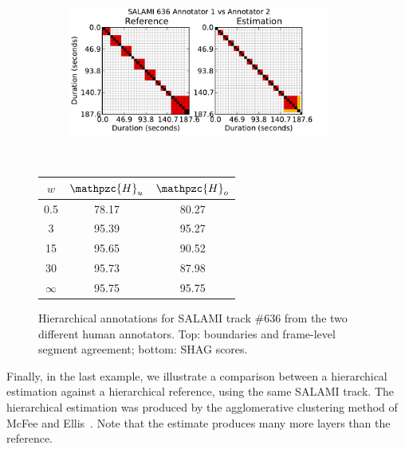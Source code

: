 \documentclass{article}
\def\shag{\ensuremath{\mathpzc{H}}}
\begin{document}
\begin{figure}[t]
  \centering
  \begin{subfigure}{0.5\textwidth}
    \centering
    \includegraphics[width=0.94\textwidth]{plots/SALAMI-SALAMI.pdf}
  \end{subfigure}%
  \\
  \begin{minipage}{0.5\textwidth}
    \centering
    \vspace{10pt}
    \begin{tabular}{|c|c|c|}
      \hline
      $w$       & $\shag_u$       & $\shag_o$      \\
      \hline
      0.5       & 78.17       & 80.27      \\     
      3         & 95.39       & 95.27      \\
      15        & 95.65       & 90.52    \\
      30        & 95.73       & 87.98    \\
      $\infty$  & 95.75       & 95.75    \\
      \hline
    \end{tabular}
  \end{minipage}
  \caption{Hierarchical annotations for SALAMI track \#636 from the two different human annotators. Top: boundaries and frame-level segment agreement; bottom: SHAG scores.}
  \label{fig:SALAMI-SALAMI}
\end{figure}

Finally, in the last example, we illustrate a comparison between a hierarchical estimation against a hierarchical reference, using the same SALAMI track.  The hierarchical estimation
was produced by the agglomerative clustering method of McFee and Ellis~\cite{McFee2014}.  Note that the estimate produces many more layers than the reference.
\end{document}
